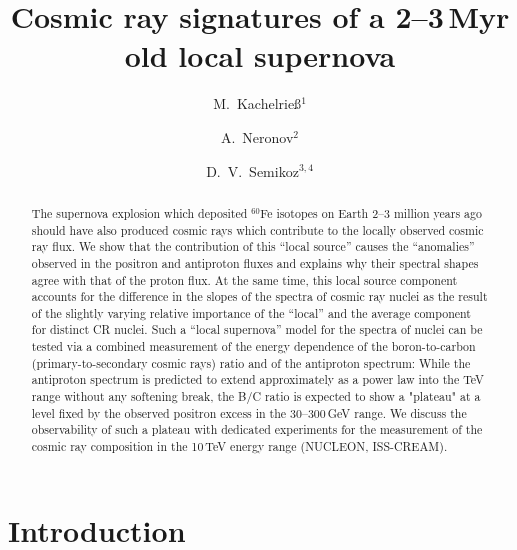 \documentclass[prd,aps,twocolumn]{revtex4}
\begin{document}
\title{Cosmic ray signatures of a 2--3\,Myr old local supernova}

\author{M.~Kachelrie\ss$^{1}$}
\author{A.~Neronov$^{2}$}
\author{D.~V.~Semikoz$^{3,4}$}


\begin{abstract}
The supernova explosion which deposited $^{60}$Fe isotopes on Earth 
2--3 million years ago should have also produced cosmic rays which contribute 
to the locally observed cosmic ray flux. We show that the contribution of 
this ``local source'' causes the ``anomalies'' observed in the positron and 
antiproton fluxes and explains why their spectral shapes agree with that of the proton flux.  At the same time, this  local source component accounts for 
the difference in the 
slopes of the spectra of cosmic ray nuclei as the result of the slightly 
varying relative importance of the ``local'' and the average component for 
distinct CR nuclei. Such a  ``local supernova'' model for the spectra of 
nuclei can 
be tested via a combined measurement of the energy dependence of the 
boron-to-carbon (primary-to-secondary cosmic rays) ratio and of the 
antiproton spectrum: While the antiproton spectrum is predicted to extend 
approximately as a power law  into the TeV range without any softening break,
the B/C ratio is expected to show a "plateau" at a level  fixed by the observed 
positron excess in the 30--300\,GeV range.  We discuss the 
observability of such a plateau with  dedicated experiments for the 
measurement  of the cosmic ray composition in the 10\,TeV energy range 
(NUCLEON, ISS-CREAM).   
\end{abstract}


\maketitle




\section{Introduction}
\end{document}
